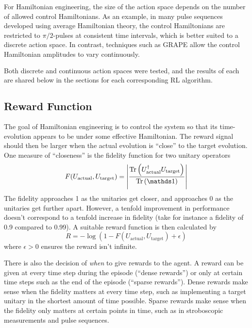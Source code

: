 For Hamiltonian engineering, the size of the action space depends on the number of allowed control Hamiltonians. As an example, in many pulse sequences developed using average Hamiltonian theory, the control Hamiltonians are restricted to $\pi/2$-pulses at consistent time intervals, which is better suited to a discrete action space. In contrast, techniques such as GRAPE
\cite{Khaneja-2005}
allow the control Hamiltonian amplitudes to vary continuously.

Both discrete and continuous action spaces were tested, and the results of each are shared below in the sections for each corresponding RL algorithm.

\subsection{Reward Function}

The goal of Hamiltonian engineering is to control the system so that its time-evolution appears to be under some effective Hamiltonian. The reward signal should then be larger when the actual evolution is ``close'' to the target evolution. One measure of ``closeness'' is the fidelity function for two unitary operators
\begin{equation} %
    F(U_\text{actual}, U_\text{target}) = \left| \frac{\Tr{
        U_\text{actual}^\dagger U_\text{target}
    }}{\Tr{\identity}} \right|
\end{equation}
The fidelity approaches 1 as the unitaries get closer, and approaches 0 as the unitaries get further apart. However, a tenfold improvement in performance doesn't correspond to a tenfold increase in fidelity (take for instance a fidelity of 0.9 compared to 0.99). A suitable reward function is then calculated by
\begin{equation}
    R = -\log(1-F(U_\text{actual}, U_\text{target}) + \epsilon)
\end{equation}
where $\epsilon>0$ ensures the reward isn't infinite.

There is also the decision of \emph{when} to give rewards to the agent. A reward can be given at every time step during the episode (``dense rewards'') or only at certain time steps such as the end of the episode (``sparse rewards'').
Dense rewards make sense when the fidelity matters at every time step, such as implementing a target unitary in the shortest amount of time possible.
Sparse rewards make sense when the fidelity only matters at certain points in time, such as in stroboscopic measurements and pulse sequences.

